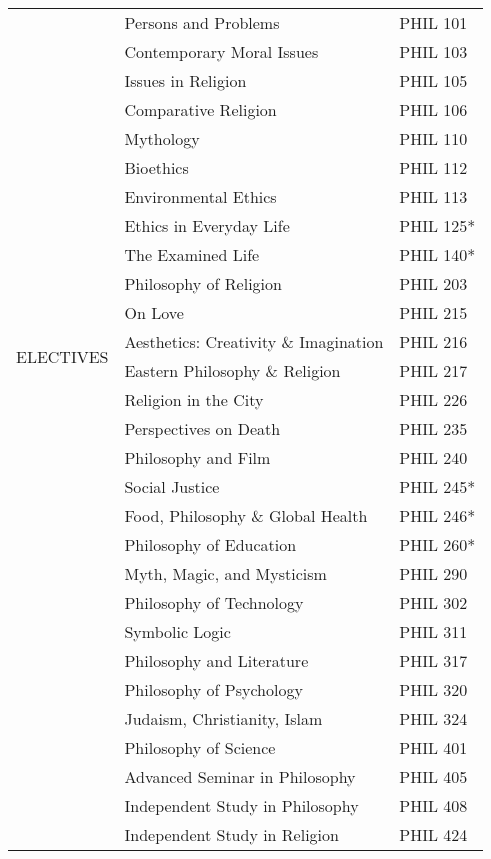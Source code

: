 \documentclass[oneside]{article}
\begin{document}
\begin{center}
\begin{tabular}{ |l|l|l| }
 \multirow{24}{*}{ELECTIVES} 
 & Persons and Problems & PHIL 101\\
 & Contemporary Moral Issues & PHIL 103\\
 & Issues in Religion & PHIL 105\\
 & Comparative Religion & PHIL 106\\
 & Mythology & PHIL 110\\
  &  Bioethics & PHIL 112 \\
 & Environmental Ethics & PHIL 113 \\
 &  Ethics in Everyday Life & PHIL 125* \\
& The Examined Life & PHIL 140* \\
  & Philosophy of Religion & PHIL 203  \\
 & On Love & PHIL 215  \\
  & Aesthetics: Creativity \& Imagination & PHIL 216  \\
   & Eastern Philosophy \& Religion & PHIL 217  \\
  & Religion in the City & PHIL 226  \\
  & Perspectives on Death & PHIL 235 \\
  & Philosophy and Film & PHIL 240 \\
    & Social Justice& PHIL 245* \\
 & Food, Philosophy \& Global Health & PHIL 246* \\
  & Philosophy of Education & PHIL 260* \\
     & Myth, Magic, and Mysticism & PHIL 290 \\
 & Philosophy of Technology & PHIL 302 \\ 
  & Symbolic Logic & PHIL 311 \\
& Philosophy and Literature & PHIL 317 \\
   & Philosophy of Psychology & PHIL 320 \\ 
        & Judaism, Christianity, Islam & PHIL 324 \\ 
    & Philosophy of Science & PHIL 401 \\ 
     & Advanced Seminar in Philosophy & PHIL 405 \\
   & Independent Study in Philosophy & PHIL 408\\
   & Independent Study in Religion & PHIL 424 \\ \hline
\end{tabular}
\end{center}
\end{document}
